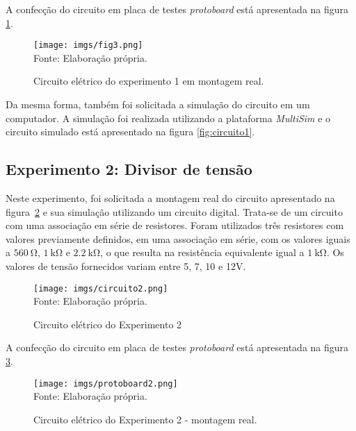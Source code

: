 \documentclass[a4paper,pra,aps,twocolumn,superscriptaddress,10pt,final]{revtex4-2}
\begin{document}
    A confecção do circuito em placa de testes \emph{protoboard} está apresentada na figura \ref{fig:protoboard1}. 
    
    \begin{figure}[H]
        \centering
        \caption{Circuito elétrico do experimento 1 em montagem real.}
        \texttt{[image: imgs/fig3.png]}\\
        \scriptsize{Fonte: Elaboração própria.}
        \label{fig:protoboard1}
    \end{figure}

    Da mesma forma, também foi solicitada a simulação do circuito em um computador. A simulação foi realizada utilizando a plataforma \emph{MultiSim} e o circuito simulado está apresentado na figura \ref{fig:circuito1}.

\subsection{Experimento 2: Divisor de tensão}
\label{subsec:exp_div_tens}

    Neste experimento, foi solicitada a montagem real do circuito apresentado na figura~\ref{fig:circuito2} e sua simulação utilizando um circuito digital. Trata-se de um  circuito  com uma associação em série de resistores. Foram utilizados três resistores com valores previamente definidos, em uma associação em série, com os valores iguais a $\qty{560}{\ohm}$, $\qty{1}{\kilo\ohm}$ e $\qty{2,2}{\kilo\ohm}$, o que resulta na resistência equivalente igual a $\qty{1}{\kilo\ohm}$. Os valores de tensão fornecidos variam entre 5, 7, 10 e 12$\unit{\volt}$.
    
    \begin{figure}[H]
        \centering
        \caption{Circuito elétrico do Experimento 2}
        \texttt{[image: imgs/circuito2.png]}\\
        \scriptsize{Fonte: Elaboração própria.}
        \label{fig:circuito2}
    \end{figure}
    
    A confecção do circuito em placa de testes \emph{protoboard} está apresentada na figura \ref{fig:protoboard2}. 
    
    \begin{figure}[htpb]
        \centering
        \caption{Circuito elétrico do Experimento 2 - montagem real.}
        \texttt{[image: imgs/protoboard2.png]}\\
        \scriptsize{Fonte: Elaboração própria.}
        \label{fig:protoboard2}
    \end{figure}
    
\end{document}
